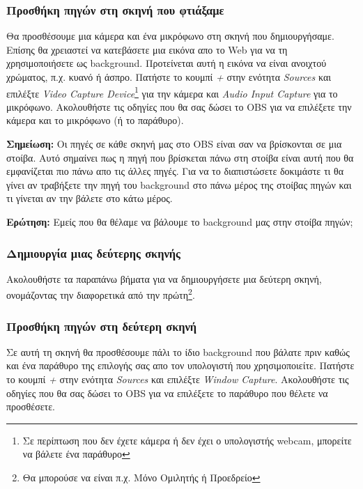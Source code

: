 \documentclass[12pt,a4paper]{article}
\begin{document}
\subsubsection{Προσθήκη πηγών στη σκηνή που φτιάξαμε}
Θα προσθέσουμε μια κάμερα και ένα μικρόφωνο στη σκηνή που δημιουργήσαμε. Επίσης θα χρειαστεί να κατεβάσετε μια
εικόνα απο το Web για να τη χρησιμοποιήσετε ως background. Προτείνεται αυτή η εικόνα να είναι
ανοιχτού χρώματος, π.χ. κυανό ή άσπρο. Πατήστε το κουμπί \textit{+} στην
ενότητα \textit{Sources} και επιλέξτε \textit{Video Capture Device}\footnote{Σε περίπτωση που δεν έχετε κάμερα ή δεν έχει ο υπολογιστής webcam, μπορείτε να βάλετε ένα παράθυρο} για την κάμερα και \textit{Audio Input Capture}
για το μικρόφωνο. Ακολουθήστε τις οδηγίες που θα σας δώσει το OBS για να επιλέξετε την κάμερα και το μικρόφωνο (ή το παράθυρο).
\begin{info}
\textbf{Σημείωση:} Οι πηγές σε κάθε σκηνή μας στο OBS είναι σαν να βρίσκονται σε μια στοίβα.
Αυτό σημαίνει πως η πηγή που βρίσκεται πάνω στη στοίβα είναι αυτή που θα εμφανίζεται πιο πάνω απο τις άλλες πηγές.
Για να το διαπιστώσετε δοκιμάστε τι θα γίνει αν τραβήξετε την πηγή του background στο πάνω μέρος της στοίβας πηγών
και τι γίνεται αν την βάλετε στο κάτω μέρος.
\end{info}
\begin{questionbox}
\textbf{Ερώτηση:} Εμείς που θα θέλαμε να βάλουμε το background μας στην στοίβα πηγών;
\end{questionbox}
\subsubsection{Δημιουργία μιας δεύτερης σκηνής}
Ακολουθήστε τα παραπάνω βήματα για να δημιουργήσετε μια δεύτερη σκηνή, ονομάζοντας
την διαφορετικά από την πρώτη\footnote{Θα μπορούσε να είναι π.χ. Μόνο Ομιλητής ή Προεδρείο}.
\subsubsection{Προσθήκη πηγών στη δεύτερη σκηνή}
Σε αυτή τη σκηνή θα προσθέσουμε πάλι το ίδιο background που βάλατε πριν καθώς και ένα παράθυρο της επιλογής σας
απο τον υπολογιστή που χρησιμοποιείτε. Πατήστε το κουμπί \textit{+} στην ενότητα \textit{Sources} και επιλέξτε \textit{Window Capture}.
Ακολουθήστε τις οδηγίες που θα σας δώσει το OBS για να επιλέξετε το παράθυρο που θέλετε να προσθέσετε.
\end{document}
